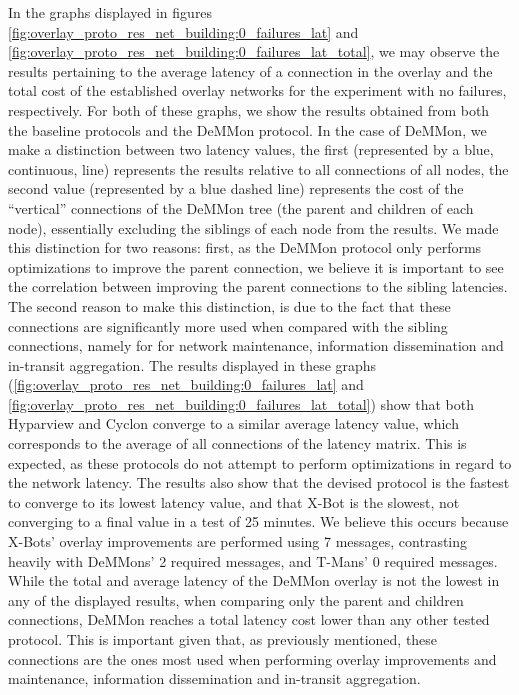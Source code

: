 In the graphs displayed in figures \ref{fig:overlay_proto_res_net_building:0_failures_lat} and \ref{fig:overlay_proto_res_net_building:0_failures_lat_total}, we may observe the results pertaining to the average latency of a connection in the overlay and the total cost of the established overlay networks for the experiment with no failures, respectively. For both of these graphs, we show the results obtained from both the baseline protocols and the DeMMon protocol. In the case of DeMMon, we make a distinction between two latency values, the first (represented by a blue, continuous, line) represents the results relative to all connections of all nodes, the second value (represented by a blue dashed line) represents the cost of the ``vertical'' connections of the DeMMon tree (the parent and children of each node), essentially excluding the siblings of each node from the results. We made this distinction for two reasons: first, as the DeMMon protocol only performs optimizations to improve the parent connection, we believe it is important to see the correlation between improving the parent connections to the sibling latencies. The second reason to make this distinction, is due to the fact that these connections are significantly more used when compared with the sibling connections, namely for for network maintenance, information dissemination and in-transit aggregation. The results displayed in these graphs (\ref{fig:overlay_proto_res_net_building:0_failures_lat} and \ref{fig:overlay_proto_res_net_building:0_failures_lat_total}) show that both Hyparview and Cyclon converge to a similar average latency value, which corresponds to the average of all connections of the latency matrix. This is expected, as these protocols do not attempt to perform optimizations in regard to the network latency. The results also show that the devised protocol is the fastest to converge to its lowest latency value, and that X-Bot is the slowest, not converging to a final value in a test of 25 minutes. We believe this occurs because X-Bots' overlay improvements are performed using 7 messages, contrasting heavily with DeMMons' 2 required messages, and T-Mans' 0 required messages. While the total and average latency of the DeMMon overlay is not the lowest in any of the displayed results, when comparing only the parent and children connections, DeMMon reaches a total latency cost lower than any other tested protocol. This is important given that, as previously mentioned, these connections are the ones most used when performing overlay improvements and maintenance, information dissemination and in-transit aggregation. 

